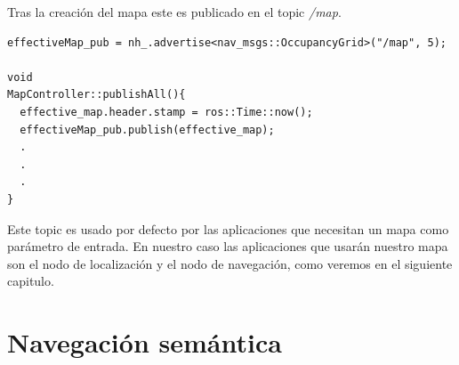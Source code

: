 Tras la creación del mapa este es publicado en el topic \textit{/map}. 

\begin{lstlisting}[caption=Publicación del mapa final, label={lst:effectivemappublish}]
effectiveMap_pub = nh_.advertise<nav_msgs::OccupancyGrid>("/map", 5);

void
MapController::publishAll(){
  effective_map.header.stamp = ros::Time::now();
  effectiveMap_pub.publish(effective_map);
  .
  .
  .
}
\end{lstlisting}


Este topic es usado por defecto por las aplicaciones que necesitan un mapa como parámetro de entrada. En nuestro caso las aplicaciones que usarán nuestro mapa son el nodo de localización y el nodo de navegación, como veremos en el siguiente capitulo. 



\section{Navegación semántica}



